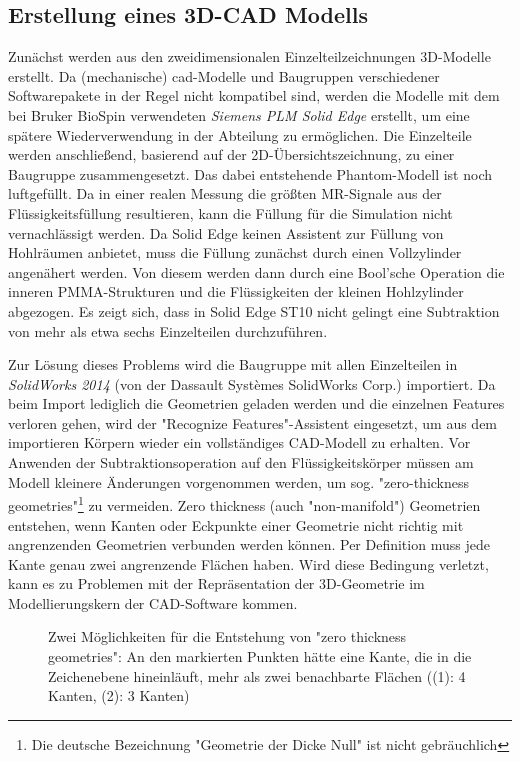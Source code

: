 \subsection{Erstellung eines 3D-CAD Modells}
Zunächst werden aus den zweidimensionalen Einzelteilzeichnungen 3D-Modelle erstellt. Da (mechanische) \gls{cad}-Modelle und Baugruppen verschiedener Softwarepakete in der Regel nicht kompatibel sind, werden die Modelle mit dem bei Bruker BioSpin verwendeten \textit{Siemens PLM Solid Edge} erstellt, um eine spätere Wiederverwendung in der Abteilung zu ermöglichen. Die Einzelteile werden anschließend, basierend auf der 2D-Übersichtszeichnung, zu einer Baugruppe zusammengesetzt. Das dabei entstehende Phantom-Modell ist noch luftgefüllt. Da in einer realen Messung die größten MR-Signale aus der Flüssigkeitsfüllung resultieren, kann die Füllung für die Simulation nicht vernachlässigt werden. Da Solid Edge keinen Assistent zur Füllung von Hohlräumen anbietet, muss die Füllung zunächst durch einen Vollzylinder angenähert werden. Von diesem werden dann durch eine Bool'sche Operation die inneren PMMA-Strukturen und die Flüssigkeiten der kleinen Hohlzylinder abgezogen. Es zeigt sich, dass in Solid Edge ST10 nicht gelingt eine Subtraktion von mehr als etwa sechs Einzelteilen durchzuführen.

Zur Lösung dieses Problems wird die Baugruppe mit allen Einzelteilen in \textit{SolidWorks 2014} (von der Dassault Systèmes SolidWorks Corp.) importiert. Da beim Import lediglich die Geometrien geladen werden und die einzelnen Features verloren gehen, wird der "Recognize Features"-Assistent eingesetzt, um aus dem importieren Körpern wieder ein vollständiges CAD-Modell zu erhalten. Vor Anwenden der Subtraktionsoperation auf den Flüssigkeitskörper müssen am Modell kleinere Änderungen vorgenommen werden, um sog. "zero-thickness geometries"\footnote{Die deutsche Bezeichnung "Geometrie der Dicke Null" ist nicht gebräuchlich} zu vermeiden. Zero thickness (auch  "non-manifold") Geometrien entstehen, wenn Kanten oder Eckpunkte einer Geometrie nicht richtig mit angrenzenden Geometrien verbunden werden können. Per Definition muss jede Kante genau zwei angrenzende Flächen haben. Wird diese Bedingung verletzt, kann es zu Problemen mit der Repräsentation der 3D-Geometrie im Modellierungskern der CAD-Software kommen.

\begin{figure}[H]
	\centering
	\caption[Zero Thickness]{Zwei Möglichkeiten für die Entstehung von "zero thickness geometries": An den markierten Punkten hätte eine Kante, die in die Zeichenebene hineinläuft, mehr als zwei benachbarte Flächen ((1): 4 Kanten, (2): 3 Kanten)}
	\label{fig:zeroThick}
\end{figure}

